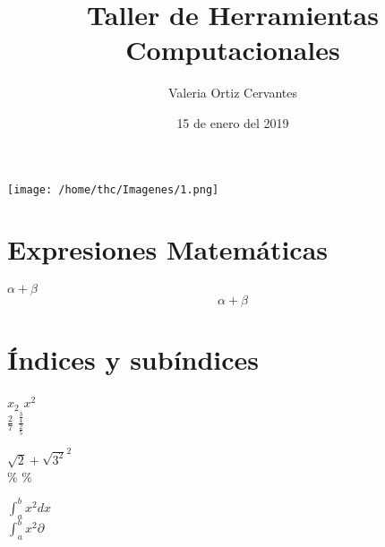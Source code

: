 \documentclass{article}
\title{\Huge Taller de Herramientas Computacionales}
\author{Valeria Ortiz Cervantes}
\date{15 de enero del 2019}
\begin{document}
	\maketitle
\begin{center}
	\texttt{[image: /home/thc/Imagenes/1.png]}
\end{center}
\newpage
\section*{Expresiones Matemáticas}
$\alpha +  \beta$\\ %
\[\alpha + \beta\] %
\section*{Índices y subíndices}
$x_{2}$ %
$x^{2}$ \\ %

$\frac{2}{7}$ %
$\frac{\frac{3}{4}}{\frac{2}{5}}$

$\sqrt{2} + \sqrt{3^2}^2$ \\
\%   $\%$

$\int_{a}^{b} x^2 dx$ \\ 
$\int_{a}^{b} x^2 \partial$
\end{document}
